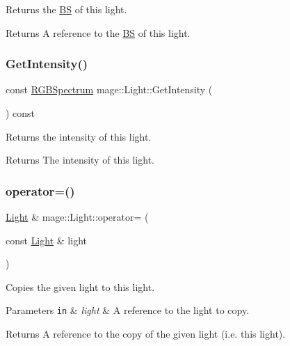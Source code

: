 Returns the \hyperlink{structmage_1_1_b_s}{BS} of this light.

\begin{DoxyReturn}{Returns}
A reference to the \hyperlink{structmage_1_1_b_s}{BS} of this light. 
\end{DoxyReturn}
\hypertarget{classmage_1_1_light_ad4ffb4c5fa06812e7d523a69b177d55a}{}\label{classmage_1_1_light_ad4ffb4c5fa06812e7d523a69b177d55a} 
\subsubsection{\texorpdfstring{Get\+Intensity()}{GetIntensity()}}
{\footnotesize\ttfamily const \hyperlink{structmage_1_1_r_g_b_spectrum}{R\+G\+B\+Spectrum} mage\+::\+Light\+::\+Get\+Intensity (\begin{DoxyParamCaption}{ }\end{DoxyParamCaption}) const\hspace{0.3cm}{\ttfamily [noexcept]}}

Returns the intensity of this light.

\begin{DoxyReturn}{Returns}
The intensity of this light. 
\end{DoxyReturn}
\hypertarget{classmage_1_1_light_ad1267c8d162e2cdead5e3a7d83cef3c1}{}\label{classmage_1_1_light_ad1267c8d162e2cdead5e3a7d83cef3c1} 
\subsubsection{\texorpdfstring{operator=()}{operator=()}\hspace{0.1cm}{\footnotesize\ttfamily [1/2]}}
{\footnotesize\ttfamily \hyperlink{classmage_1_1_light}{Light} \& mage\+::\+Light\+::operator= (\begin{DoxyParamCaption}\item[{const \hyperlink{classmage_1_1_light}{Light} \&}]{light }\end{DoxyParamCaption})\hspace{0.3cm}{\ttfamily [default]}}

Copies the given light to this light.


\begin{DoxyParams}[1]{Parameters}
\mbox{\tt in}  & {\em light} & A reference to the light to copy. \\
\hline
\end{DoxyParams}
\begin{DoxyReturn}{Returns}
A reference to the copy of the given light (i.\+e. this light). 
\end{DoxyReturn}
\hypertarget{classmage_1_1_light_a5fd2edc3fcbcc1dbe7a2620b76cedd25}{}\label{classmage_1_1_light_a5fd2edc3fcbcc1dbe7a2620b76cedd25} 
